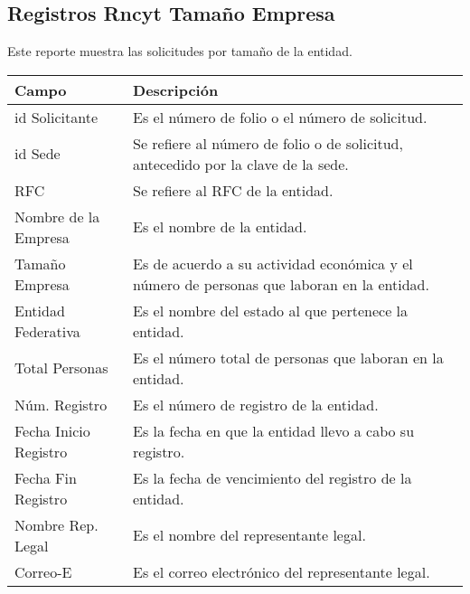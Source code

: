 \subsection{Registros Rncyt Tamaño Empresa}
\label{appendix:Reportes:PeopleSoft:RegistrosRncytTamanoEmpresa}

Este reporte muestra las solicitudes por tamaño de la entidad.\\

\begin{tabular}{ m{} m{}  }%
	\rowcolor{gray1} {\bf Campo} &  {\bf Descripción} \\ \hline \hline

	id Solicitante & Es el número de folio o el número de solicitud.\\
	\rowcolor{gray1}id Sede & Se refiere al número de folio o de solicitud, antecedido por la clave de la sede.\\
	RFC & Se refiere al RFC de la entidad.\\
	\rowcolor{gray1}Nombre de la Empresa & Es el nombre de la entidad.\\
	Tamaño Empresa & Es de acuerdo a su actividad económica y el número de personas que laboran en la entidad.\\
	\rowcolor{gray1}Entidad Federativa & Es el nombre del estado al que pertenece la entidad.\\
	Total Personas & Es el número total de personas que laboran en la entidad.\\
	\rowcolor{gray1}Núm. Registro & Es el número de registro de la entidad.\\
	Fecha Inicio Registro & Es la fecha en que la entidad llevo a cabo su registro.\\
	\rowcolor{gray1}Fecha Fin Registro & Es la fecha de vencimiento del registro de la entidad.\\
	Nombre Rep. Legal & Es el nombre del representante legal.\\
	\rowcolor{gray1}Correo-E & Es el correo electrónico del representante legal.\\
\end{tabular}

